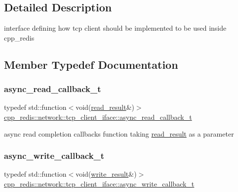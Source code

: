 \subsection{Detailed Description}
interface defining how tcp client should be implemented to be used inside cpp\+\_\+redis 

\subsection{Member Typedef Documentation}
\mbox{\label{classcpp__redis_1_1network_1_1tcp__client__iface_ae8bf79e8e1f1d7e359ed1c7cdc4026fc}} 
\subsubsection{\texorpdfstring{async\+\_\+read\+\_\+callback\+\_\+t}{async\_read\_callback\_t}}
{\footnotesize\ttfamily typedef std\+::function$<$void(\mbox{\hyperlink{structcpp__redis_1_1network_1_1tcp__client__iface_1_1read__result}{read\+\_\+result}}\&)$>$ \mbox{\hyperlink{classcpp__redis_1_1network_1_1tcp__client__iface_ae8bf79e8e1f1d7e359ed1c7cdc4026fc}{cpp\+\_\+redis\+::network\+::tcp\+\_\+client\+\_\+iface\+::async\+\_\+read\+\_\+callback\+\_\+t}}}

async read completion callbacks function taking \mbox{\hyperlink{structcpp__redis_1_1network_1_1tcp__client__iface_1_1read__result}{read\+\_\+result}} as a parameter \mbox{\label{classcpp__redis_1_1network_1_1tcp__client__iface_a1dc52ccc70cf377c4fbb495a16adc658}} 
\subsubsection{\texorpdfstring{async\+\_\+write\+\_\+callback\+\_\+t}{async\_write\_callback\_t}}
{\footnotesize\ttfamily typedef std\+::function$<$void(\mbox{\hyperlink{structcpp__redis_1_1network_1_1tcp__client__iface_1_1write__result}{write\+\_\+result}}\&)$>$ \mbox{\hyperlink{classcpp__redis_1_1network_1_1tcp__client__iface_a1dc52ccc70cf377c4fbb495a16adc658}{cpp\+\_\+redis\+::network\+::tcp\+\_\+client\+\_\+iface\+::async\+\_\+write\+\_\+callback\+\_\+t}}}

